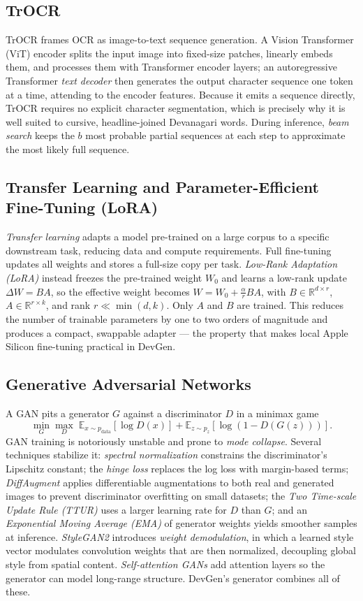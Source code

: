 \documentclass[12pt,a4paper]{report}
\begin{document}
\subsection{TrOCR}
TrOCR frames OCR as image-to-text sequence generation. A Vision Transformer (ViT) encoder splits the input image into fixed-size patches, linearly embeds them, and processes them with Transformer encoder layers; an autoregressive Transformer \textit{text decoder} then generates the output character sequence one token at a time, attending to the encoder features. Because it emits a sequence directly, TrOCR requires no explicit character segmentation, which is precisely why it is well suited to cursive, headline-joined Devanagari words. During inference, \textit{beam search} keeps the $b$ most probable partial sequences at each step to approximate the most likely full sequence.

\subsection{Transfer Learning and Parameter-Efficient Fine-Tuning (LoRA)}
\textit{Transfer learning} adapts a model pre-trained on a large corpus to a specific downstream task, reducing data and compute requirements. Full fine-tuning updates all weights and stores a full-size copy per task. \textit{Low-Rank Adaptation (LoRA)} instead freezes the pre-trained weight $W_0$ and learns a low-rank update $\Delta W = BA$, so the effective weight becomes $W = W_0 + \frac{\alpha}{r}BA$, with $B \in \mathbb{R}^{d\times r}$, $A \in \mathbb{R}^{r\times k}$, and rank $r \ll \min(d,k)$. Only $A$ and $B$ are trained. This reduces the number of trainable parameters by one to two orders of magnitude and produces a compact, swappable adapter --- the property that makes local Apple Silicon fine-tuning practical in DevGen.

\subsection{Generative Adversarial Networks}
A GAN pits a generator $G$ against a discriminator $D$ in a minimax game
\[
\min_G \max_D \; \mathbb{E}_{x\sim p_{\mathrm{data}}}[\log D(x)] + \mathbb{E}_{z\sim p_z}[\log(1 - D(G(z)))].
\]
GAN training is notoriously unstable and prone to \textit{mode collapse}. Several techniques stabilize it: \textit{spectral normalization} constrains the discriminator's Lipschitz constant; the \textit{hinge loss} replaces the log loss with margin-based terms; \textit{DiffAugment} applies differentiable augmentations to both real and generated images to prevent discriminator overfitting on small datasets; the \textit{Two Time-scale Update Rule (TTUR)} uses a larger learning rate for $D$ than $G$; and an \textit{Exponential Moving Average (EMA)} of generator weights yields smoother samples at inference. \textit{StyleGAN2} introduces \textit{weight demodulation}, in which a learned style vector modulates convolution weights that are then normalized, decoupling global style from spatial content. \textit{Self-attention GANs} add attention layers so the generator can model long-range structure. DevGen's generator combines all of these.
\end{document}
